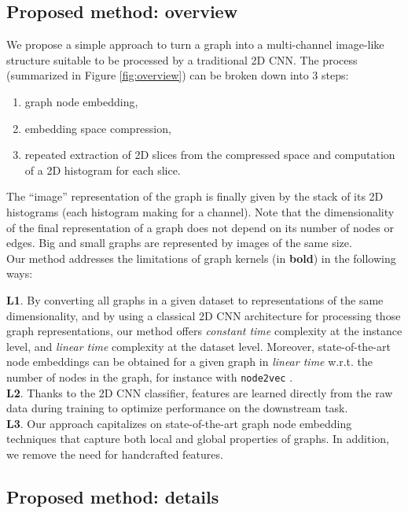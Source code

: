 \documentclass[sigconf]{acmart}
\begin{document}
\subsection{Proposed method: overview}
We propose a simple approach to turn a graph into a multi-channel image-like structure suitable to be processed by a traditional 2D CNN. The process (summarized in Figure \ref{fig:overview}) can be broken down into 3 steps:
\begin{enumerate}
\item graph node embedding,
\item embedding space compression,
\item repeated extraction of 2D slices from the compressed space and computation of a 2D histogram for each slice.
\end{enumerate}
The ``image'' representation of the graph is finally given by the stack of its 2D histograms (each histogram making for a channel). Note that the dimensionality of the final representation of a graph does not depend on its number of nodes or edges. Big and small graphs are represented by images of the same size.\\

Our method addresses the limitations of graph kernels (in \textbf{bold}) in the following ways: 

\textbf{L1}. By converting all graphs in a given dataset to representations of the same dimensionality, and by using a classical 2D CNN architecture for processing those graph representations, our method offers \textit{constant time} complexity at the instance level, and \textit{linear time} complexity at the dataset level. Moreover, state-of-the-art node embeddings can be obtained for a given graph in \textit{linear time} w.r.t. the number of nodes in the graph, for instance with \texttt{node2vec} \citep{grover2016node2vec}. \\
\textbf{L2}. Thanks to the 2D CNN classifier, features are learned directly from the raw data during training to optimize performance on the downstream task. \\
\textbf{L3}. Our approach capitalizes on state-of-the-art graph node embedding techniques that capture both local and global properties of graphs. In addition, we remove the need for handcrafted features.

\subsection{Proposed method: details}
\end{document}
